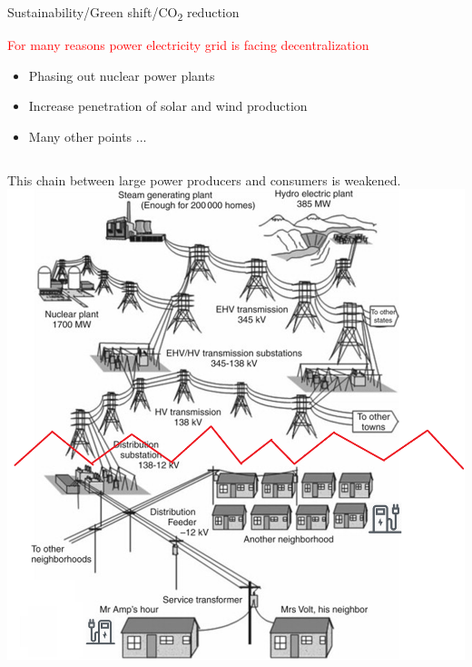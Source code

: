 \documentclass[12pt]{beamer}
\begin{document}

\begin{frame}{Sustainability/Green shift/CO\textsubscript{2} reduction}
\begin{alertblock}{\textcolor{red}{For many reasons power electricity grid is facing decentralization}}
\begin{itemize}
\item Phasing out nuclear power plants
\item Increase penetration of solar and wind production
\item Many other points ...
\end{itemize}
\end{alertblock}
\begin{columns}
    This chain between large power producers and consumers is weakened.
\includegraphics[width=2 in , height=1.6 in]{Figures/EVchalendgebreak.png}
\end{columns}
\end{frame}
\end{document}
